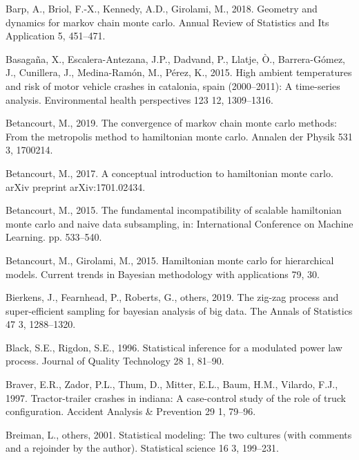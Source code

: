\documentclass[12pt]{book}
\numberwithin{equation}{chapter}
\begin{document}
\leavevmode\hypertarget{ref-barp2018geometry}{}%
Barp, A., Briol, F.-X., Kennedy, A.D., Girolami, M., 2018. Geometry and dynamics for markov chain monte carlo. Annual Review of Statistics and Its Application 5, 451--471.

\leavevmode\hypertarget{ref-basagana2015high}{}%
Basagaña, X., Escalera-Antezana, J.P., Dadvand, P., Llatje, Ò., Barrera-Gómez, J., Cunillera, J., Medina-Ramón, M., Pérez, K., 2015. High ambient temperatures and risk of motor vehicle crashes in catalonia, spain (2000--2011): A time-series analysis. Environmental health perspectives 123 12, 1309--1316.

\leavevmode\hypertarget{ref-betancourt2019convergence}{}%
Betancourt, M., 2019. The convergence of markov chain monte carlo methods: From the metropolis method to hamiltonian monte carlo. Annalen der Physik 531 3, 1700214.

\leavevmode\hypertarget{ref-betancourt2017conceptual}{}%
Betancourt, M., 2017. A conceptual introduction to hamiltonian monte carlo. arXiv preprint arXiv:1701.02434.

\leavevmode\hypertarget{ref-betancourt2015fundamental}{}%
Betancourt, M., 2015. The fundamental incompatibility of scalable hamiltonian monte carlo and naive data subsampling, in: International Conference on Machine Learning. pp. 533--540.

\leavevmode\hypertarget{ref-betancourt2015hamiltonian}{}%
Betancourt, M., Girolami, M., 2015. Hamiltonian monte carlo for hierarchical models. Current trends in Bayesian methodology with applications 79, 30.

\leavevmode\hypertarget{ref-bierkens2019zig}{}%
Bierkens, J., Fearnhead, P., Roberts, G., others, 2019. The zig-zag process and super-efficient sampling for bayesian analysis of big data. The Annals of Statistics 47 3, 1288--1320.

\leavevmode\hypertarget{ref-black1996statistical}{}%
Black, S.E., Rigdon, S.E., 1996. Statistical inference for a modulated power law process. Journal of Quality Technology 28 1, 81--90.

\leavevmode\hypertarget{ref-braver1997tractor}{}%
Braver, E.R., Zador, P.L., Thum, D., Mitter, E.L., Baum, H.M., Vilardo, F.J., 1997. Tractor-trailer crashes in indiana: A case-control study of the role of truck configuration. Accident Analysis \& Prevention 29 1, 79--96.

\leavevmode\hypertarget{ref-breiman2001statistical}{}%
Breiman, L., others, 2001. Statistical modeling: The two cultures (with comments and a rejoinder by the author). Statistical science 16 3, 199--231.
\end{document}
